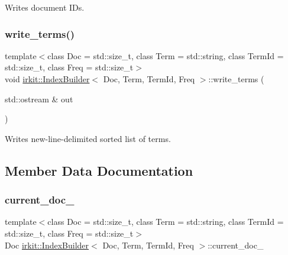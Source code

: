 Writes document I\+Ds. 

\mbox{\label{classirkit_1_1IndexBuilder_a7c81e735e585ec41a7e5e334e4416874}} 
\subsubsection{\texorpdfstring{write\+\_\+terms()}{write\_terms()}}
{\footnotesize\ttfamily template$<$class Doc  = std\+::size\+\_\+t, class Term  = std\+::string, class Term\+Id  = std\+::size\+\_\+t, class Freq  = std\+::size\+\_\+t$>$ \\
void \hyperlink{classirkit_1_1IndexBuilder}{irkit\+::\+Index\+Builder}$<$ Doc, Term, Term\+Id, Freq $>$\+::write\+\_\+terms (\begin{DoxyParamCaption}\item[{std\+::ostream \&}]{out }\end{DoxyParamCaption})\hspace{0.3cm}{\ttfamily [inline]}}



Writes new-\/line-\/delimited sorted list of terms. 



\subsection{Member Data Documentation}
\mbox{\label{classirkit_1_1IndexBuilder_a52d46fb2bd04b9e5ee0e9fdcf98e2f7b}} 
\subsubsection{\texorpdfstring{current\+\_\+doc\+\_\+}{current\_doc\_}}
{\footnotesize\ttfamily template$<$class Doc  = std\+::size\+\_\+t, class Term  = std\+::string, class Term\+Id  = std\+::size\+\_\+t, class Freq  = std\+::size\+\_\+t$>$ \\
Doc \hyperlink{classirkit_1_1IndexBuilder}{irkit\+::\+Index\+Builder}$<$ Doc, Term, Term\+Id, Freq $>$\+::current\+\_\+doc\+\_\+\hspace{0.3cm}{\ttfamily [protected]}}

